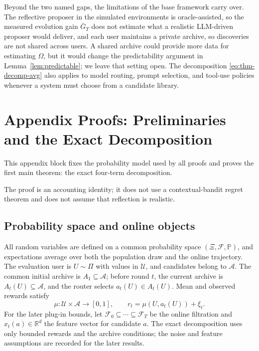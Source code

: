 \documentclass{article} %
\begin{document}
Beyond the two named gaps, the limitations of the base framework carry over. The reflective proposer in the simulated environments is oracle-assisted, so the measured evolution gain $\bar G_T$ does not estimate what a realistic LLM-driven proposer would deliver, and each user maintains a private archive, so discoveries are not shared across users. A shared archive could provide more data for estimating \(\Omega\), but it would change the predictability argument in Lemma~\ref{lem:predictable}; we leave that setting open. The decomposition \eqref{eq:thm-decomp-avg} also applies to model routing, prompt selection, and tool-use policies whenever a system must choose from a candidate library.

\appendix

\section{Appendix Proofs: Preliminaries and the Exact Decomposition}

\label{app:proofs}

This appendix block fixes the probability model used by all proofs and proves the first main theorem: the exact four-term decomposition.

The proof is an accounting identity; it does not use a contextual-bandit regret theorem and does not assume that reflection is realistic.

\subsection{Probability space and online objects}

All random variables are defined on a common probability space
\((\Xi,\mathcal F,\mathbb P)\), and expectations average over both the
population draw and the online trajectory.  The evaluation user is
\(U\sim\Pi\) with values in \(\mathcal U\), and candidates belong to
\(\mathcal A\).  The common initial archive is \(A_1\subseteq\mathcal A\);
before round \(t\), the current archive is \(A_t(U)\subseteq\mathcal A\), and
the router selects \(a_t(U)\in A_t(U)\).  Mean and observed rewards satisfy
\begin{equation}
\mu:\mathcal U\times\mathcal A\to[0,1],
\qquad
r_t=\mu(U,a_t(U))+\xi_t.
\end{equation}
For the later plug-in bounds, let
\(\mathcal F_0\subseteq\cdots\subseteq\mathcal F_T\) be the online filtration
and \(x_t(a)\in\mathbb R^d\) the feature vector for candidate \(a\).  The exact
decomposition uses only bounded rewards and the archive conditions; the noise
and feature assumptions are recorded for the later results.
\end{document}
